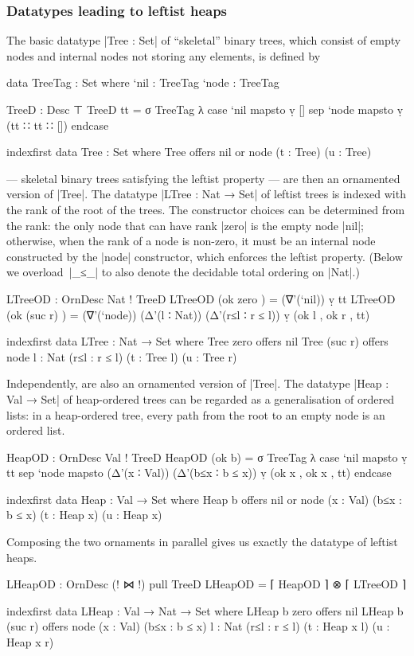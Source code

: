 \subsubsection{Datatypes leading to leftist heaps}

The basic datatype |Tree : Set| of ``skeletal'' binary trees, which consist of empty nodes and internal nodes not storing any elements, is defined by
\begin{code}
data TreeTag : Set where
  `nil   : TreeTag
  `node  : TreeTag

TreeD : Desc ⊤
TreeD tt = σ TreeTag λ  case  `nil   mapsto  ṿ []
                        sep   `node  mapsto  ṿ (tt ∷ tt ∷ []) endcase

indexfirst data Tree : Set where
  Tree  offers  nil
        or      node (t : Tree) (u : Tree)
\end{code}
 --- skeletal binary trees satisfying the leftist property --- are then an ornamented version of |Tree|.
The datatype |LTree : Nat → Set| of leftist trees is indexed with the rank of the root of the trees.
The constructor choices can be determined from the rank: the only node that can have rank |zero| is the empty node |nil|; otherwise, when the rank of a node is non-zero, it must be an internal node constructed by the |node| constructor, which enforces the leftist property.
(Below we overload~|_≤_| to also denote the decidable total ordering on |Nat|.)
\begin{code}
LTreeOD : OrnDesc Nat ! TreeD
LTreeOD (ok zero     )   =  (∇'(`nil)) ṿ tt
LTreeOD (ok (suc r)  )   =  (∇'(`node)) (Δ'(l ∶ Nat)) (Δ'(r≤l ∶ r ≤ l)) ṿ (ok l , ok r , tt)

indexfirst data LTree : Nat → Set where
  Tree zero     offers  nil
  Tree (suc r)  offers  node {l : Nat} (r≤l : r ≤ l) (t : Tree l) (u : Tree r)
\end{code}
Independently,  are also an ornamented version of |Tree|.
The datatype |Heap : Val → Set| of heap-ordered trees can be regarded as a generalisation of ordered lists: in a heap-ordered tree, every path from the root to an empty node is an ordered list.
\begin{code}
HeapOD : OrnDesc Val ! TreeD
HeapOD (ok b) =
  σ TreeTag  λ  case  `nil   mapsto  ṿ tt
                sep   `node  mapsto  (Δ'(x ∶ Val)) (Δ'(b≤x ∶ b ≤ x)) ṿ (ok x , ok x , tt) endcase

indexfirst data Heap : Val → Set where
  Heap b  offers  nil
          or      node (x : Val) (b≤x : b ≤ x) (t : Heap x) (u : Heap x)
\end{code}
Composing the two ornaments in parallel gives us exactly the datatype of leftist heaps.
\begin{code}
LHeapOD : OrnDesc (! ⋈ !) pull TreeD
LHeapOD = ⌈ HeapOD ⌉ ⊗ ⌈ LTreeOD ⌉

indexfirst data LHeap : Val → Nat → Set where
  LHeap b zero     offers  nil
  LHeap b (suc r)  offers  node  (x : Val) (b≤x : b ≤ x)
                                 {l : Nat} (r≤l : r ≤ l) (t : Heap x l) (u : Heap x r)
\end{code}

